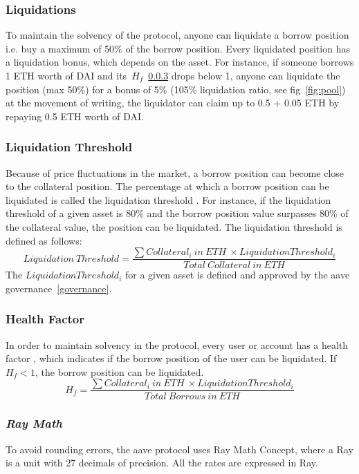 \documentclass[11pt,a4paper]{report}
\begin{document}
\subsubsection{Liquidations}\cite{aaveV1}\cite{liquidation} 
To maintain the solvency of the protocol, anyone can liquidate a borrow position i.e. buy a maximum of 50\% of the borrow position. Every liquidated position has a liquidation bonus, which depends on the asset. For instance, if someone borrows 1 ETH worth of DAI and its~$H_{f}$~\ref{hf} drops below 1, anyone can liquidate the position (max 50\%) for a bonus of 5\% (105\% liquidation ratio, see fig~\ref{fig:pool}) at the movement of writing, the liquidator can claim up to 0.5 + 0.05 ETH by repaying 0.5 ETH worth of DAI.
\subsubsection{Liquidation Threshold}\label{liquidation}
Because of price fluctuations in the market, a borrow position can become close to the collateral position. The percentage at which a borrow position can be liquidated is called the liquidation threshold\cite{aaveV1}\cite{risk} . For instance, if the liquidation threshold of a given asset is 80\% and the borrow position value surpasses 80\% of the collateral value, the position can be liquidated. The liquidation threshold is defined as follows:
\[ Liquidation~Threshold = \frac{\sum Collateral_{i}~in~ETH~\times Liquidation Threshold_{i}}{Total~Collateral~in~ETH} \]
The $Liquidation Threshold_{i}$ for a given asset is defined and approved by the aave governance~\ref{governance}.
\subsubsection{Health Factor}\label{hf}
In order to maintain solvency in the protocol, every user or account has a health factor\cite{aaveV1}\cite{risk} , which indicates if the borrow position of the user can be liquidated. If~$H_{f} < 1$, the borrow position can be liquidated.
\[ H_{f} = \frac{\sum Collateral_{i}~in~ETH~\times Liquidation Threshold_{i}}{Total~Borrows~in~ETH} \]

\subsubsection{\textit{Ray Math}}\label{ray}
To avoid rounding errors, the aave protocol uses Ray Math Concept\cite{ray}\cite{ray2}, where a Ray is a unit with 27 decimals of precision. All the rates are expressed in Ray.
\end{document}
